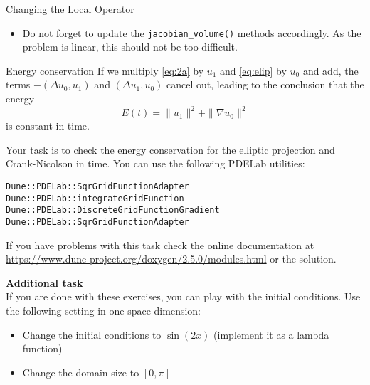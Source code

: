 \documentclass[12pt,a4paper]{article}
\begin{document}
\begin{Exercise}{Changing the Local Operator}
\begin{itemize}
    See how it is done for the $\Delta u_0$, we recall the
    corresponding part of \lstinline{WaveL2::alpha_volume()}:
  \begin{lstlisting}
// integrate u*phi_i
for (size_t i=0; i<lfsu0.size(); i++) {
	r.accumulate(lfsu0,i,u1*phihat[i]*factor);
	r.accumulate(lfsu1,i,u0*phihat[i]*factor);
}
  \end{lstlisting}

  \item Do not forget to update the \lstinline{jacobian_volume()}
    methods accordingly. As the problem is linear, this should not be
    too difficult.
  \end{itemize}
\end{Exercise}


\begin{Exercise}{Energy conservation}
  If we multiply \eqref{eq:2a} by $u_1$ and \eqref{eq:elip} by $u_0$
  and add, the terms $-(\Delta u_0,u_1 )$ and $(\Delta u_1,u_0 )$
  cancel out, leading to the conclusion that the energy
  $$E(t) = \|u_1\|^2 + \| \nabla u_0\|^2 $$ is constant in time.


  Your task is to check the energy conservation for the elliptic
  projection and Crank-Nicolson in time. You can use the following
  PDELab utilities:
  \begin{lstlisting}
Dune::PDELab::SqrGridFunctionAdapter
Dune::PDELab::integrateGridFunction
Dune::PDELab::DiscreteGridFunctionGradient
Dune::PDELab::SqrGridFunctionAdapter
  \end{lstlisting}

  If you have problems with this task check the online documentation
  at \url{https://www.dune-project.org/doxygen/2.5.0/modules.html} or
  the solution.
\end{Exercise}


\textbf{Additional task}\\
If you are done with these exercises, you can play with the initial
conditions. Use the following setting in one space dimension:
\begin{itemize}
\item Change the initial conditions to $\sin(2x)$ (implement it as a
  lambda function)
\item Change the domain size to $[0,\pi]$
\end{itemize}




\end{document}
